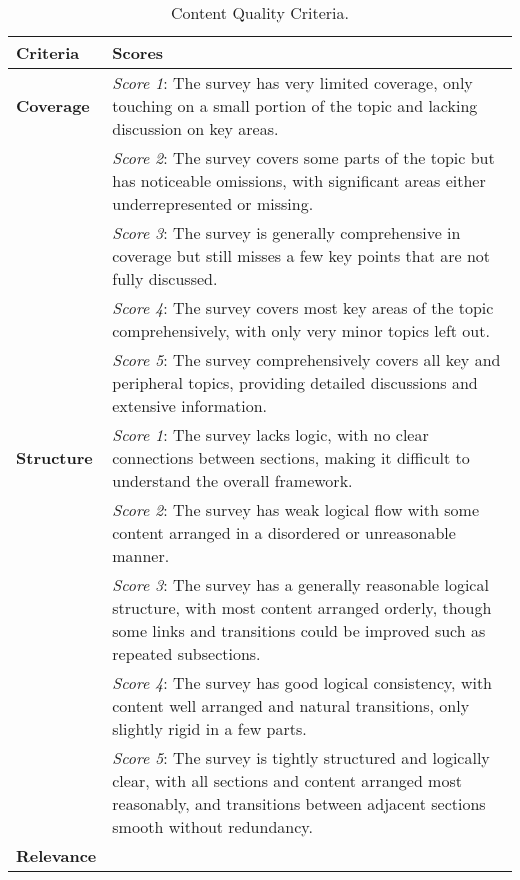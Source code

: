 \begin{table}[ht!]
\centering
\caption{Content Quality Criteria.}
\label{table: criteria}
\tiny
\begin{tabular}{p{1cm} p{12cm}}
\toprule
\textbf{Criteria} & \textbf{Scores} \\
\midrule
\textbf{Coverage} & 

                \textit{Score 1}: The survey has very limited coverage, only touching on a small portion of the topic and lacking discussion on key areas. \\
                  & \textit{Score 2}: The survey covers some parts of the topic but has noticeable omissions, with significant areas either underrepresented or missing. \\
                  & \textit{Score 3}: The survey is generally comprehensive in coverage but still misses a few key points that are not fully discussed. \\
                  & \textit{Score 4}: The survey covers most key areas of the topic comprehensively, with only very minor topics left out. \\
                  & \textit{Score 5}: The survey comprehensively covers all key and peripheral topics, providing detailed discussions and extensive information. \\
\midrule
\textbf{Structure} & 

\textit{Score 1}: The survey lacks logic, with no clear connections between sections, making it difficult to understand the overall framework. \\
                   & \textit{Score 2}: The survey has weak logical flow with some content arranged in a disordered or unreasonable manner. \\
                   & \textit{Score 3}: The survey has a generally reasonable logical structure, with most content arranged orderly, though some links and transitions could be improved such as repeated subsections. \\
                   & \textit{Score 4}: The survey has good logical consistency, with content well arranged and natural transitions, only slightly rigid in a few parts. \\
                   & \textit{Score 5}: The survey is tightly structured and logically clear, with all sections and content arranged most reasonably, and transitions between adjacent sections smooth without redundancy. \\
\midrule
\textbf{Relevance} & 


\end{tabular}
\end{table}
